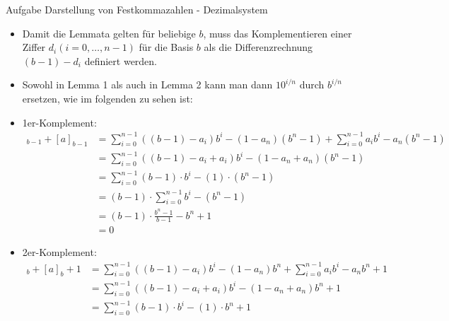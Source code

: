 \begin{frame}[allowframebreaks]{Aufgabe \thesection}{Darstellung von Festkommazahlen - Dezimalsystem}
  \begin{solutionnoinc}
    \begin{itemize}
        \item Damit die Lemmata gelten für beliebige $b$, muss das Komplementieren einer Ziffer $d_i (i = 0, \ldots, n - 1)$ für die Basis $b$ als die Differenzrechnung $(b - 1) - d_i$ definiert werden. 
        \item Sowohl in Lemma 1 als auch in Lemma 2 kann man dann $10^{i/n}$ durch $b^{i/n}$ ersetzen, wie im folgenden zu sehen ist:
    \end{itemize}
  \end{solutionnoinc}
  \begin{solutionnoinc}
    \begin{itemize}
        \item \alert{1er-Komplement:} \tiny
        \vspace{-0.5cm}
        \begin{align*}
            [a^{\prime}]_{b-1}+[a]_{b-1}&=\sum_{i=0}^{n-1}((b-1) - a_{i})b^{i}-(1-a_{n})(b^{n}-1)+\sum_{i=0}^{n-1}a_{i}b^{i}-a_{n}(b^{n}-1)\\
            &=\sum_{i=0}^{n-1}((b-1)-a_{i}+a_{i}){b^{i}}-(1-a_{n}+a_{n})(b^{n}-1)\\
            &=\sum_{i=0}^{n-1}(b-1)\cdot b^{i}-(1)\cdot (b^{n}-1)\\
            &=(b-1)\cdot\sum_{i=0}^{n-1}b^{i}-(b^{n}-1)\\
            &=(b-1)\cdot\frac{b^{n}-1}{b-1}-b^{n}+1\\
            &=0
        \end{align*}
    \end{itemize}
  \end{solutionnoinc}
  \begin{solution}
    \begin{itemize}
        \item \alert{2er-Komplement:} \tiny
        \vspace{-0.5cm}
        \begin{align*}
            [a^{\prime}]_{b}+[a]_{b}+1&=\sum_{i=0}^{n-1}((b-1)-a_{i})b^{i}-(1-a_{n})b^{n}+\sum_{i=0}^{n-1}a_{i}b^{i}-a_{n}b^{n}+1\\
            &=\sum_{i=0}^{n-1}((b-1)-a_{i}+a_{i}){b^{i}}-(1-a_{n}+a_{n}){b^{n}}+1\\
            &=\sum_{i=0}^{n-1}(b-1)\cdot b^{i}-(1)\cdot b^{n}+1\\

\end{align*}
\end{itemize}
\end{solution}
\end{frame}
